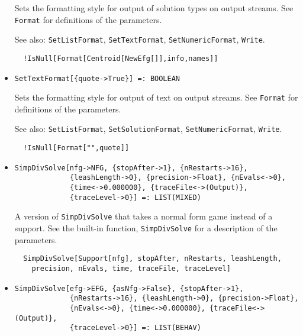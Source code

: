 \begin{itemize}
\bd Sets the formatting style for output of solution types on output
streams.  See \verb+Format+ for definitions of the parameters.
\item [See also:] \verb+SetListFormat+, \verb+SetTextFormat+, 
\verb+SetNumericFormat+, \verb+Write+.
\begin{verbatim}
  !IsNull[Format[Centroid[NewEfg[]],info,names]]
\end{verbatim} 
\ed

\item{}
\protect \large \begin{verbatim}
SetTextFormat[{quote->True}] =: BOOLEAN 
\end{verbatim}\normalsize

\bd 
Sets the formatting style for output of text on output streams.
See \verb+Format+ for definitions of the parameters.
\item [See also:] \verb+SetListFormat+, \verb+SetSolutionFormat+, 
\verb+SetNumericFormat+, \verb+Write+.
\begin{verbatim}
  !IsNull[Format["",quote]]
\end{verbatim} 
\ed

\item{}
\protect \large \begin{verbatim}
SimpDivSolve[nfg->NFG, {stopAfter->1}, {nRestarts->16}, 
             {leashLength->0}, {precision->Float}, {nEvals<->0}, 
             {time<->0.000000}, {traceFile<->(Output)}, 
             {traceLevel->0}] =: LIST(MIXED) 
\end{verbatim}\normalsize

\bd 
A version of \verb+SimpDivSolve+ that takes a normal form
game instead of a support.  See the built-in function,
\verb+SimpDivSolve+ for a description of the parameters.
\begin{verbatim}
  SimpDivSolve[Support[nfg], stopAfter, nRestarts, leashLength,
    precision, nEvals, time, traceFile, traceLevel]
\end{verbatim} 
\ed

\item{}
\protect \large \begin{verbatim}
SimpDivSolve[efg->EFG, {asNfg->False}, {stopAfter->1}, 
             {nRestarts->16}, {leashLength->0}, {precision->Float}, 
             {nEvals<->0}, {time<->0.000000}, {traceFile<->(Output)}, 
             {traceLevel->0}] =: LIST(BEHAV) 
\end{verbatim}\normalsize


\end{itemize}
